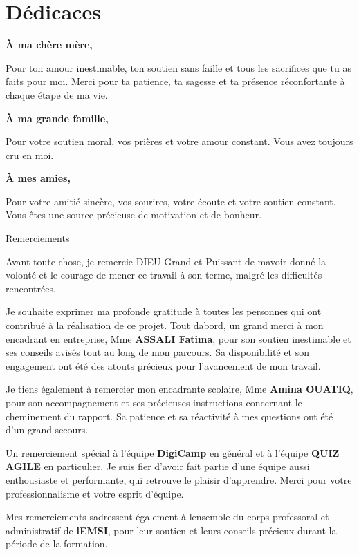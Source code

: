 \documentclass[12pt,a4paper,twoside]{report}
\begin{document}
\tableofcontents
\newpage

\chapter{Dédicaces}

\textbf{À ma chère mère,}

Pour ton amour inestimable, ton soutien sans faille et tous les
sacrifices que tu as faits pour moi. Merci pour ta patience, ta sagesse
et ta présence réconfortante à chaque étape de ma vie.

\textbf{À ma grande famille,}

Pour votre soutien moral, vos prières et votre amour constant. Vous avez
toujours cru en moi.

\textbf{À mes amies,}

Pour votre amitié sincère, vos sourires, votre écoute et votre soutien
constant. Vous êtes une source précieuse de motivation et de bonheur.

Remerciements

Avant toute chose, je remercie DIEU Grand et Puissant de
m\textquotesingle avoir donné la volonté et le courage de mener ce
travail à son terme, malgré les difficultés rencontrées.

Je souhaite exprimer ma profonde gratitude à toutes les personnes qui
ont contribué à la réalisation de ce projet. Tout
d\textquotesingle abord, un grand merci à mon encadrant en entreprise,
Mme \textbf{ASSALI Fatima}, pour son soutien inestimable et ses conseils
avisés tout au long de mon parcours. Sa disponibilité et son engagement
ont été des atouts précieux pour l'avancement de mon travail.

Je tiens également à remercier mon encadrante scolaire, Mme
\textbf{Amina OUATIQ}, pour son accompagnement et ses précieuses
instructions concernant le cheminement du rapport. Sa patience et sa
réactivité à mes questions ont été d'un grand secours.

Un remerciement spécial à l'équipe \textbf{DigiCamp} en général et à
l'équipe \textbf{QUIZ AGILE} en particulier. Je suis fier d'avoir fait
partie d'une équipe aussi enthousiaste et performante, qui retrouve le
plaisir d'apprendre. Merci pour votre professionnalisme et votre esprit
d'équipe.

Mes remerciements s\textquotesingle adressent également à
l\textquotesingle ensemble du corps professoral et administratif de
\textbf{l\textquotesingle EMSI}, pour leur soutien et leurs conseils
précieux durant la période de la formation.
\end{document}
